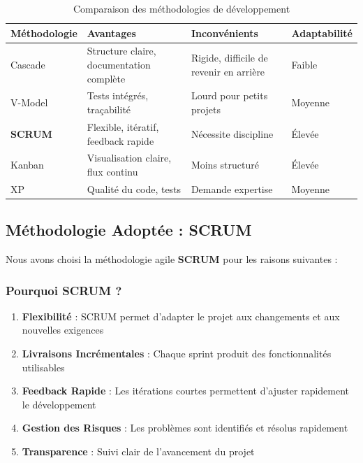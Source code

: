 \begin{table}[H]
\centering
\caption{Comparaison des méthodologies de développement}
\label{tab:methodologies}
\begin{tabular}{|l|p{4cm}|p{4cm}|p{3cm}|}
\hline
\textbf{Méthodologie} & \textbf{Avantages} & \textbf{Inconvénients} & \textbf{Adaptabilité} \\
\hline
Cascade & Structure claire, documentation complète & Rigide, difficile de revenir en arrière & Faible \\
\hline
V-Model & Tests intégrés, traçabilité & Lourd pour petits projets & Moyenne \\
\hline
\textbf{SCRUM} & Flexible, itératif, feedback rapide & Nécessite discipline & Élevée \\
\hline
Kanban & Visualisation claire, flux continu & Moins structuré & Élevée \\
\hline
XP & Qualité du code, tests & Demande expertise & Moyenne \\
\hline
\end{tabular}
\end{table}

\subsection{Méthodologie Adoptée : SCRUM}

Nous avons choisi la méthodologie agile \textbf{SCRUM} pour les raisons suivantes :

\subsubsection{Pourquoi SCRUM ?}

\begin{enumerate}
    \item \textbf{Flexibilité} : SCRUM permet d'adapter le projet aux changements et aux nouvelles exigences
    \item \textbf{Livraisons Incrémentales} : Chaque sprint produit des fonctionnalités utilisables
    \item \textbf{Feedback Rapide} : Les itérations courtes permettent d'ajuster rapidement le développement
    \item \textbf{Gestion des Risques} : Les problèmes sont identifiés et résolus rapidement
    \item \textbf{Transparence} : Suivi clair de l'avancement du projet
\end{enumerate}

